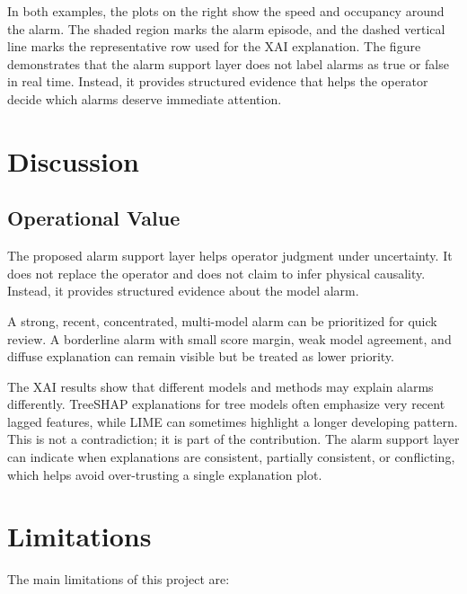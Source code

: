 \documentclass[10pt,a4paper]{article}
\begin{document}
	In both examples, the plots on the right show the speed and occupancy around the alarm. The shaded region marks the alarm episode, and the dashed vertical line marks the representative row used for the XAI explanation. The figure demonstrates that the alarm support layer does not label alarms as true or false in real time. Instead, it provides structured evidence that helps the operator decide which alarms deserve immediate attention.
	
	\section{Discussion}
	
	\subsection{Operational Value}
	
	The proposed alarm support layer helps operator judgment under uncertainty. It does not replace the operator and does not claim to infer physical causality. Instead, it provides structured evidence about the model alarm.
	
	A strong, recent, concentrated, multi-model alarm can be prioritized for quick review. A borderline alarm with small score margin, weak model agreement, and diffuse explanation can remain visible but be treated as lower priority.
	
	The XAI results show that different models and methods may explain alarms differently. TreeSHAP explanations for tree models often emphasize very recent lagged features, while LIME can sometimes highlight a longer developing pattern. This is not a contradiction; it is part of the contribution. The alarm support layer can indicate when explanations are consistent, partially consistent, or conflicting, which helps avoid over-trusting a single explanation plot.
	
	\section{Limitations}
	
	The main limitations of this project are:
	
\end{document}
